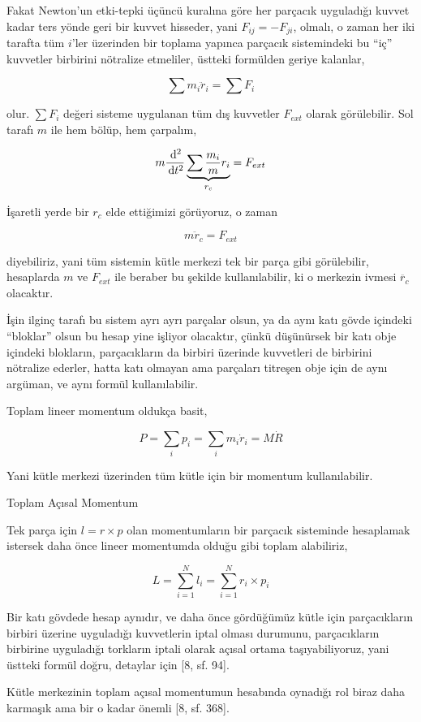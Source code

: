 \documentclass[12pt,fleqn]{article}\usepackage{../../common}
\begin{document}
Fakat Newton'un etki-tepki üçüncü kuralına göre her parçacık uyguladığı kuvvet
kadar ters yönde geri bir kuvvet hisseder, yani $F_{ij} = -F_{ji}$, olmalı, o
zaman her iki tarafta tüm $i$'ler üzerinden bir toplama yapınca parçacık
sistemindeki bu ``iç'' kuvvetler birbirini nötralize etmeliler, üstteki
formülden geriye kalanlar,

$$
\sum m_i \ddot{r}_i =  \sum F_i
$$

olur. $\sum F_i$ değeri sisteme uygulanan tüm dış kuvvetler $F_{ext}$ olarak
görülebilir. Sol tarafı $m$ ile hem bölüp, hem çarpalım,

$$
m \frac{\,\mathrm{d}^2}{\,\mathrm{d} t^2} \underbrace{\sum \frac{m_i}{m} r_i}_{r_c} =
F_{ext}
$$

İşaretli yerde bir $r_c$ elde ettiğimizi görüyoruz, o zaman 

$$
m\ddot{r}_c = F_{ext}
$$

diyebiliriz, yani tüm sistemin kütle merkezi tek bir parça gibi görülebilir,
hesaplarda $m$ ve $F_{ext}$ ile beraber bu şekilde kullanılabilir, ki
o merkezin ivmesi $\ddot{r_c}$ olacaktır.

İşin ilginç tarafı bu sistem ayrı ayrı parçalar olsun, ya da aynı katı gövde
içindeki ``bloklar'' olsun bu hesap yine işliyor olacaktır, çünkü düşünürsek bir
katı obje içindeki blokların, parçacıkların da birbiri üzerinde kuvvetleri de
birbirini nötralize ederler, hatta katı olmayan ama parçaları titreşen obje için
de aynı argüman, ve aynı formül kullanılabilir.

Toplam lineer momentum oldukça basit,

$$
P = \sum_i p_i = \sum_i m_i \dot{r}_i = M \dot{R}
$$

Yani kütle merkezi üzerinden tüm kütle için bir momentum kullanılabilir.

Toplam Açısal Momentum

Tek parça için $l = r \times p$ olan momentumların bir parçacık sisteminde
hesaplamak istersek daha önce lineer momentumda olduğu gibi toplam alabiliriz,

$$
L = \sum_{i=1}^{N} l_i = \sum_{i=1}^{N} r_i \times p_i
$$

Bir katı gövdede hesap aynıdır, ve daha önce gördüğümüz kütle için parçacıkların
birbiri üzerine uyguladığı kuvvetlerin iptal olması durumunu, parçacıkların
birbirine uyguladığı torkların iptali olarak açısal ortama taşıyabiliyoruz, yani
üstteki formül doğru, detaylar için [8, sf. 94].

Kütle merkezinin toplam açısal momentumun hesabında oynadığı rol biraz daha
karmaşık ama bir o kadar önemli [8, sf. 368].
\end{document}
